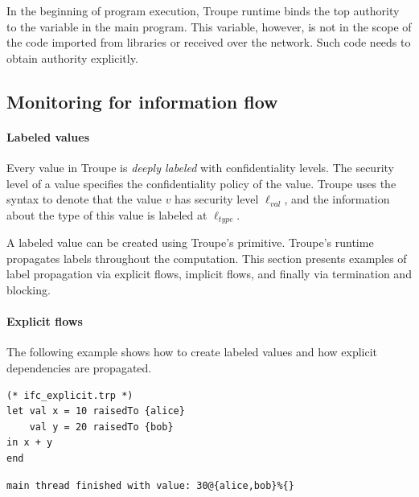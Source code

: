 In the beginning of program execution, Troupe runtime binds the top authority to the variable  in the main program. This variable, however, is not in the scope of the code imported from libraries or received over the network. Such code needs to obtain authority explicitly. 




%
%
%
\subsection{Monitoring for information flow}



\paragraph{Labeled values}
Every value in Troupe is \emph{deeply labeled} with confidentiality
levels. The security level of 
a value specifies the confidentiality policy of the 
value. Troupe uses the syntax  to 
denote that the value $\mathit{v}$ has security level 
$\mathit{\ell_{\mathit{val}}}$, and the information about the type of this value is labeled at $\mathit{\ell_{\mathit{type}}}$.

A labeled value can be created using Troupe's 
primitive. Troupe's runtime propagates labels throughout the computation.
This section presents examples of label propagation via explicit flows, implicit flows, and
finally via termination and blocking.


\paragraph{Explicit flows}
The following example shows how to create labeled values and how explicit dependencies are propagated.
\begin{lstlisting}
(* ifc_explicit.trp *)
let val x = 10 raisedTo {alice}
    val y = 20 raisedTo {bob}
in x + y
end
\end{lstlisting}
\begin{verbatim}
main thread finished with value: 30@{alice,bob}%{}
\end{verbatim}



